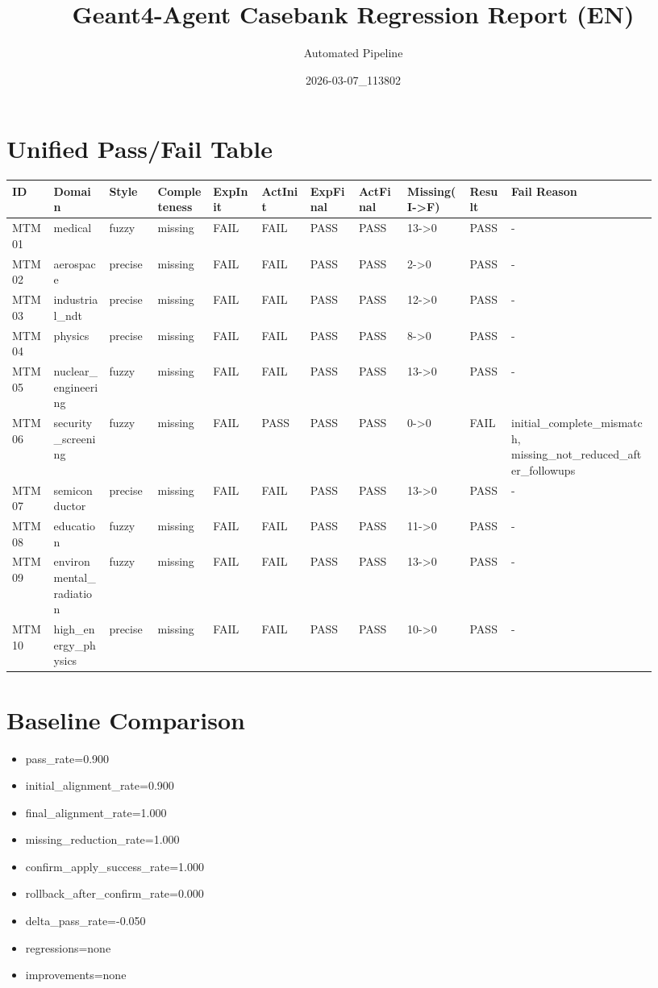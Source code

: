 \documentclass[11pt]{ctexart}
\title{Geant4-Agent Casebank Regression Report (EN)}
\author{Automated Pipeline}
\date{2026-03-07\_113802}
\begin{document}
\maketitle
\section{Unified Pass/Fail Table}
\begin{longtable}{p{0.06\linewidth}p{0.08\linewidth}p{0.07\linewidth}p{0.08\linewidth}p{0.07\linewidth}p{0.07\linewidth}p{0.07\linewidth}p{0.07\linewidth}p{0.09\linewidth}p{0.06\linewidth}p{0.21\linewidth}}
\toprule
ID & Domain & Style & Completeness & ExpInit & ActInit & ExpFinal & ActFinal & Missing(I->F) & Result & Fail Reason \\
\midrule
MTM01 & medical & fuzzy & missing & FAIL & FAIL & PASS & PASS & 13->0 & PASS & - \\
MTM02 & aerospace & precise & missing & FAIL & FAIL & PASS & PASS & 2->0 & PASS & - \\
MTM03 & industrial\_ndt & precise & missing & FAIL & FAIL & PASS & PASS & 12->0 & PASS & - \\
MTM04 & physics & precise & missing & FAIL & FAIL & PASS & PASS & 8->0 & PASS & - \\
MTM05 & nuclear\_engineering & fuzzy & missing & FAIL & FAIL & PASS & PASS & 13->0 & PASS & - \\
MTM06 & security\_screening & fuzzy & missing & FAIL & PASS & PASS & PASS & 0->0 & FAIL & initial\_complete\_mismatch, missing\_not\_reduced\_after\_followups \\
MTM07 & semiconductor & precise & missing & FAIL & FAIL & PASS & PASS & 13->0 & PASS & - \\
MTM08 & education & fuzzy & missing & FAIL & FAIL & PASS & PASS & 11->0 & PASS & - \\
MTM09 & environmental\_radiation & fuzzy & missing & FAIL & FAIL & PASS & PASS & 13->0 & PASS & - \\
MTM10 & high\_energy\_physics & precise & missing & FAIL & FAIL & PASS & PASS & 10->0 & PASS & - \\
\bottomrule
\end{longtable}
\section{Baseline Comparison}
\begin{itemize}
\item pass\_rate=0.900
\item initial\_alignment\_rate=0.900
\item final\_alignment\_rate=1.000
\item missing\_reduction\_rate=1.000
\item confirm\_apply\_success\_rate=1.000
\item rollback\_after\_confirm\_rate=0.000
\item delta\_pass\_rate=-0.050
\item regressions=none
\item improvements=none
\end{itemize}
\appendix
\end{document}
